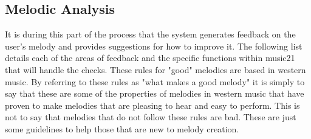 \subsection{Melodic Analysis}
\label{subsec:melodicanalysis}

It is during this part of the process that the system generates feedback on the user's melody and provides suggestions for how to improve it.  The following list details each of the areas of feedback and the specific functions within music21 that will handle the checks.  These rules for "good" melodies are based in western music.  By referring to these rules as "what makes a good melody" it is simply to say that these are some of the properties of melodies in western music that have proven to make melodies that are pleasing to hear and easy to perform.  This is not to say that melodies that do not follow these rules are bad.  These are just some guidelines to help those that are new to melody creation.


